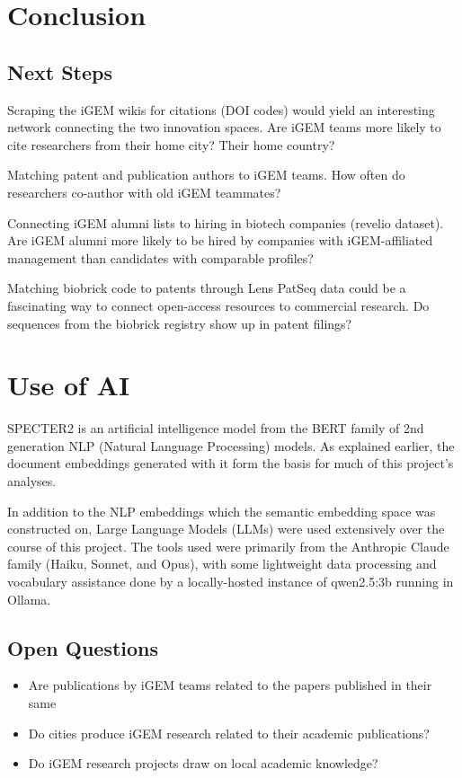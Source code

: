 \documentclass[12pt,a4paper]{article}
\begin{document}
	
	\section{Conclusion}
	
	\subsection{Next Steps}
	
	Scraping the iGEM wikis for citations (DOI codes) would yield an interesting network connecting the two innovation spaces. Are iGEM teams more likely to cite researchers from their home city? Their home country?
	
	Matching patent and publication authors to iGEM teams. How often do researchers co-author with old iGEM teammates?
	
	Connecting iGEM alumni lists to hiring in biotech companies (revelio dataset). Are iGEM alumni more likely to be hired by companies with iGEM-affiliated management than candidates with comparable profiles?
	
	Matching biobrick code to patents through Lens PatSeq data could be a fascinating way to connect open-access resources to commercial research. Do sequences from the biobrick registry show up in patent filings?
	
	\section{Use of AI}
	
	
	SPECTER2 is an artificial intelligence model from the BERT \parencite{devlinBERTPretrainingDeep2019} family of 2nd generation NLP (Natural Language Processing) models. As explained earlier, the document embeddings generated with it form the basis for much of this project's analyses.
	
	In addition to the NLP embeddings which the semantic embedding space was constructed on, Large Language Models (LLMs) were used extensively over the course of this project. The tools used were primarily from the Anthropic Claude family (Haiku, Sonnet, and Opus), with some lightweight data processing and vocabulary assistance done by a locally-hosted instance of qwen2.5:3b running in Ollama.
	
	\subsection{Open Questions}
	
	
	\begin{itemize}
		\item Are publications by iGEM teams related to the papers published in their same
		\item Do cities produce iGEM research related to their academic publications?
		\item Do iGEM research projects draw on local academic knowledge?
	\end{itemize}
	
	
	
\printbibliography
	
\end{document}
